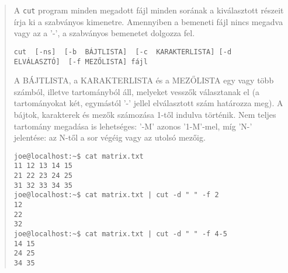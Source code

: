 \noindent {} 
\begin{quotation}
       A  \verb.cut.  program  minden  megadott  fájl  minden  sorának a kiválasztott
       részeit írja ki a szabványos  kimenetre.  Amennyiben  a  bemeneti  fájl
       nincs megadva vagy az a '-', a szabványos bemenetet dolgozza fel.

\begin{small}
\begin{verbatim}
cut  [-ns]  [-b  BÁJTLISTA]  [-c  KARAKTERLISTA] [-d  ELVÁLASZTÓ]  [-f MEZŐLISTA] fájl
\end{verbatim}
\end{small}

       A  BÁJTLISTA,  a  KARAKTERLISTA  és  a MEZŐLISTA egy vagy több számból, illetve tartományból áll,  melyeket  vesszők  választanak  el  (a  tartományokat  két, egymástól '-' jellel elválasztott szám határozza meg).
       A bájtok, karakterek és mezők számozása  1-től  indulva  történik.  Nem teljes  tartomány  megadása  is  lehetséges: '-M' azonos '1-M'-mel, míg
       'N-' jelentése: az N-től a sor végéig vagy az utolsó mezőig.


\begin{lstlisting}
joe@localhost:~$ cat matrix.txt 
11 12 13 14 15
21 22 23 24 25
31 32 33 34 35
joe@localhost:~$ cat matrix.txt | cut -d " " -f 2
12
22
32
joe@localhost:~$ cat matrix.txt | cut -d " " -f 4-5
14 15
24 25
34 35
\end{lstlisting}

\end{quotation}

